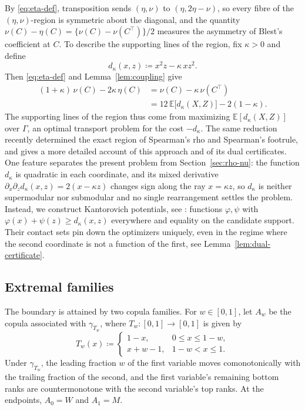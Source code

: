 \documentclass[11pt,a4paper]{article}
\theoremstyle{remark}
\newcommand{\E}{\mathbb{E}}
\newcommand{\1}{\mathbf{1}}
\newcommand{\Gam}{\Gamma}
\begin{document}
By \eqref{eq:eta-def}, transposition sends $(\eta,\nu)$ to $(\eta,2\eta-\nu)$, so every fibre of the $(\eta,\nu)$-region is symmetric about the diagonal, and the quantity $\nu(C)-\eta(C)=\{\nu(C)-\nu(C^\top)\}/2$ measures the asymmetry of Blest's coefficient at $C$.
To describe the supporting lines of the region, fix $\kappa>0$ and define
\[
  d_\kappa(x,z)\coloneqq x^2z-\kappa\,xz^2.
\]
Then \eqref{eq:eta-def} and Lemma~\ref{lem:coupling} give
\begin{equation}
  \label{eq:eta-nu-support}
  \begin{aligned}
  (1+\kappa)\,\nu(C)-2\kappa\,\eta(C)
  &=\nu(C)-\kappa\,\nu(C^\top)\\
  &=12\,\E\bigl[d_\kappa(X,Z)\bigr]-2(1-\kappa).
  \end{aligned}
\end{equation}
The supporting lines of the region thus come from maximizing $\E[d_\kappa(X,Z)]$ over $\Gam$, an optimal transport problem for the cost $-d_\kappa$.
The same reduction recently determined the exact region of Spearman's rho and Spearman's footrule, and \cite{ansari2026rhofootrule} gives a more detailed account of this approach and of its dual certificates.
One feature separates the present problem from Section~\ref{sec:rho-nu}: the function $d_\kappa$ is quadratic in each coordinate, and its mixed derivative $\partial_x\partial_zd_\kappa(x,z)=2(x-\kappa z)$ changes sign along the ray $x=\kappa z$, so $d_\kappa$ is neither supermodular nor submodular and no single rearrangement settles the problem.
Instead, we construct Kantorovich potentials, see \cite[Ch.~5]{villani2009optimal}: functions $\varphi,\psi$ with $\varphi(x)+\psi(z)\ge d_\kappa(x,z)$ everywhere and equality on the candidate support.
Their contact sets pin down the optimizers uniquely, even in the regime where the second coordinate is not a function of the first, see Lemma~\ref{lem:dual-certificate}.

\subsection{Extremal families}
\label{sec:eta-families}

The boundary is attained by two copula families.
For $w\in[0,1]$, let $A_w$ be the copula associated with $\gamma_{T_w}$, where $T_w:[0,1]\to[0,1]$ is given by
\begin{equation}
  \label{eq:Tw-def}
  T_w(x)\coloneqq
  \begin{cases}
    1-x, & 0\le x\le1-w,\\
    x+w-1, & 1-w<x\le1.
  \end{cases}
\end{equation}
Under $\gamma_{T_w}$, the leading fraction $w$ of the first variable moves comonotonically with the trailing fraction of the second, and the first variable's remaining bottom ranks are countermonotone with the second variable's top ranks.
At the endpoints, $A_0=W$ and $A_1=M$.
\end{document}
